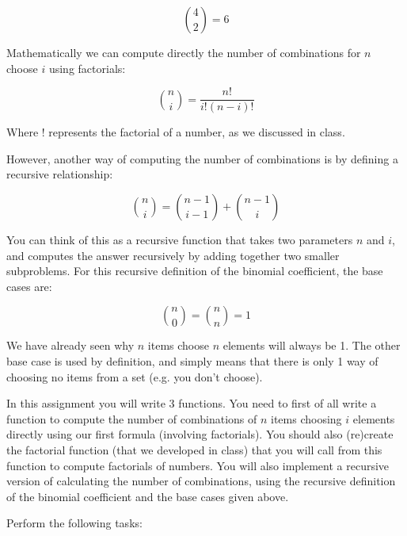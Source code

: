 \documentclass[11pt]{article}
\begin{document}
$$
{4 \choose 2} = 6
$$

Mathematically we can compute directly the number of combinations for
$n$ choose $i$ using factorials:

$$
{n \choose i} = \frac{n!}{i! (n - i)!}
$$

Where $!$ represents the factorial of a number, as we discussed in
class.

However, another way of computing the number of combinations is by
defining a recursive relationship:

$$
{n \choose i} = {n-1 \choose i-1} + {n-1 \choose i}
$$

You can think of this as a recursive function that takes two parameters
$n$ and $i$, and computes the answer recursively by adding together
two smaller subproblems.  For this recursive definition of the
binomial coefficient, the base cases are:

$$
{n \choose 0} = {n \choose n} = 1
$$

We have already seen why $n$ items choose $n$ elements will always
be 1.  The other base case is used by definition, and simply means
that there is only 1 way of choosing no items from a set (e.g. you
don't choose).

In this assignment you will write 3 functions.  You need to first of
all write a function to compute the number of combinations of $n$
items choosing $i$ elements directly using our first formula
(involving factorials).  You should also (re)create the factorial
function (that we developed in class) that you will call from this
function to compute factorials of numbers.  You will also implement a
recursive version of calculating the number of combinations, using the
recursive definition of the binomial coefficient and the base cases
given above.


Perform the following tasks:
\end{document}
